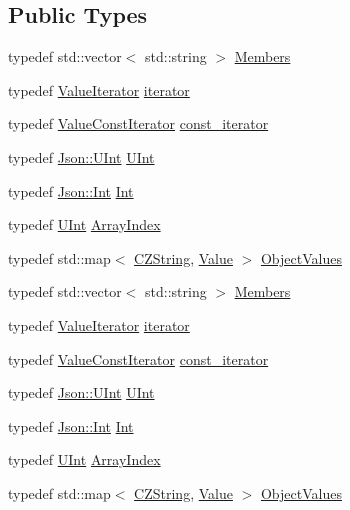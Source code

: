 \subsection*{Public Types}
\begin{DoxyCompactItemize}
\item 
typedef std\-::vector$<$ std\-::string $>$ \hyperlink{classJson_1_1Value_ac61bab5a465848b57610379cc07995c3}{Members}
\item 
typedef \hyperlink{classJson_1_1ValueIterator}{Value\-Iterator} \hyperlink{classJson_1_1Value_a341cdf2e01f8b3c5b7317aa2f0768c53}{iterator}
\item 
typedef \hyperlink{classJson_1_1ValueConstIterator}{Value\-Const\-Iterator} \hyperlink{classJson_1_1Value_af92282ca92b58b320debd486afb7696a}{const\-\_\-iterator}
\item 
typedef \hyperlink{namespaceJson_a800fb90eb6ee8d5d62b600c06f87f7d4}{Json\-::\-U\-Int} \hyperlink{classJson_1_1Value_a0933d59b45793ae4aade1757c322a98d}{U\-Int}
\item 
typedef \hyperlink{namespaceJson_a08122e8005b706d982e48cca1e2119c7}{Json\-::\-Int} \hyperlink{classJson_1_1Value_abdf7a7ff73eb130ffcab28504ffdb405}{Int}
\item 
typedef \hyperlink{classJson_1_1Value_a0933d59b45793ae4aade1757c322a98d}{U\-Int} \hyperlink{classJson_1_1Value_a5b1b5f0fbe81bec133b054419a6273cd}{Array\-Index}
\item 
typedef std\-::map$<$ \hyperlink{classJson_1_1Value_1_1CZString}{C\-Z\-String}, \hyperlink{classJson_1_1Value}{Value} $>$ \hyperlink{classJson_1_1Value_a08b6c80c3af7071d908dabf044de5388}{Object\-Values}
\item 
typedef std\-::vector$<$ std\-::string $>$ \hyperlink{classJson_1_1Value_ac61bab5a465848b57610379cc07995c3}{Members}
\item 
typedef \hyperlink{classJson_1_1ValueIterator}{Value\-Iterator} \hyperlink{classJson_1_1Value_a341cdf2e01f8b3c5b7317aa2f0768c53}{iterator}
\item 
typedef \hyperlink{classJson_1_1ValueConstIterator}{Value\-Const\-Iterator} \hyperlink{classJson_1_1Value_af92282ca92b58b320debd486afb7696a}{const\-\_\-iterator}
\item 
typedef \hyperlink{namespaceJson_a800fb90eb6ee8d5d62b600c06f87f7d4}{Json\-::\-U\-Int} \hyperlink{classJson_1_1Value_a0933d59b45793ae4aade1757c322a98d}{U\-Int}
\item 
typedef \hyperlink{namespaceJson_a08122e8005b706d982e48cca1e2119c7}{Json\-::\-Int} \hyperlink{classJson_1_1Value_abdf7a7ff73eb130ffcab28504ffdb405}{Int}
\item 
typedef \hyperlink{classJson_1_1Value_a0933d59b45793ae4aade1757c322a98d}{U\-Int} \hyperlink{classJson_1_1Value_a5b1b5f0fbe81bec133b054419a6273cd}{Array\-Index}
\item 
typedef std\-::map$<$ \hyperlink{classJson_1_1Value_1_1CZString}{C\-Z\-String}, \hyperlink{classJson_1_1Value}{Value} $>$ \hyperlink{classJson_1_1Value_a08b6c80c3af7071d908dabf044de5388}{Object\-Values}
\end{DoxyCompactItemize}
